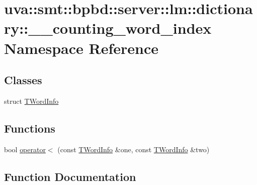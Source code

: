 \hypertarget{namespaceuva_1_1smt_1_1bpbd_1_1server_1_1lm_1_1dictionary_1_1____counting__word__index}{}\section{uva\+:\+:smt\+:\+:bpbd\+:\+:server\+:\+:lm\+:\+:dictionary\+:\+:\+\_\+\+\_\+counting\+\_\+word\+\_\+index Namespace Reference}
\label{namespaceuva_1_1smt_1_1bpbd_1_1server_1_1lm_1_1dictionary_1_1____counting__word__index}
\subsection*{Classes}
\begin{DoxyCompactItemize}
\item 
struct \hyperlink{structuva_1_1smt_1_1bpbd_1_1server_1_1lm_1_1dictionary_1_1____counting__word__index_1_1_t_word_info}{T\+Word\+Info}
\end{DoxyCompactItemize}
\subsection*{Functions}
\begin{DoxyCompactItemize}
\item 
bool \hyperlink{namespaceuva_1_1smt_1_1bpbd_1_1server_1_1lm_1_1dictionary_1_1____counting__word__index_af039b7ba0b45163ac9660a1d50fb6f1f}{operator$<$} (const \hyperlink{structuva_1_1smt_1_1bpbd_1_1server_1_1lm_1_1dictionary_1_1____counting__word__index_1_1_t_word_info}{T\+Word\+Info} \&one, const \hyperlink{structuva_1_1smt_1_1bpbd_1_1server_1_1lm_1_1dictionary_1_1____counting__word__index_1_1_t_word_info}{T\+Word\+Info} \&two)
\end{DoxyCompactItemize}


\subsection{Function Documentation}
\hypertarget{namespaceuva_1_1smt_1_1bpbd_1_1server_1_1lm_1_1dictionary_1_1____counting__word__index_af039b7ba0b45163ac9660a1d50fb6f1f}{}
